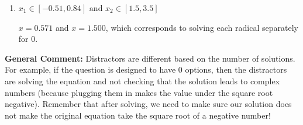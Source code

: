 \documentclass{extbook}[14pt]
\begin{document}
\begin{enumerate}
{\begin{enumerate}[label=\Alph*.]
*$x = -0.667$ leads to a complex value in the equation, so this is the correct option.
\item \( x_1 \in [-0.51, 0.84] \text{ and } x_2 \in [1.5,3.5] \)

$x = 0.571$ and $x = 1.500$, which corresponds to solving each radical separately for 0.
\end{enumerate}

\textbf{General Comment:} Distractors are different based on the number of solutions. For example, if the question is designed to have 0 options, then the distractors are solving the equation and not checking that the solution leads to complex numbers (because plugging them in makes the value under the square root negative). Remember that after solving, we need to make sure our solution does not make the original equation take the square root of a negative number!
}
\end{enumerate}
\end{document}
